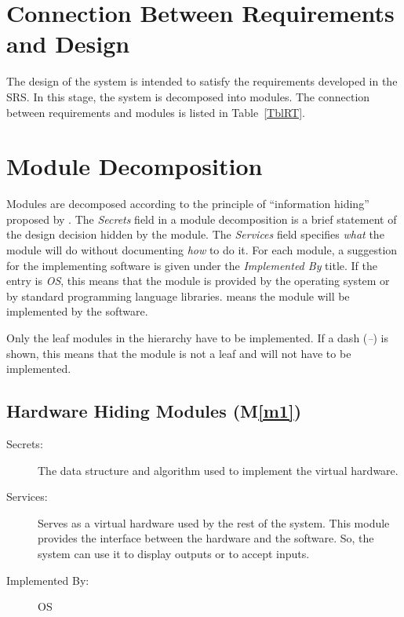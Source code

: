 \documentclass[12pt, titlepage]{article}
\newcommand{\mref}[1]{M\ref{#1}}
\begin{document}
\begin{table}[H]
\begin{longtable}{p{} p{}}
		\end{longtable}
		
		\label{TblMH}
	\end{table}
	\normalsize
	
	\section{Connection Between Requirements and Design} \label{SecConnection}
	
	The design of the system is intended to satisfy the requirements developed in
	the SRS. In this stage, the system is decomposed into modules. The connection
	between requirements and modules is listed in Table~\ref{TblRT}.
	
	\section{Module Decomposition} \label{SecMD}
	
	Modules are decomposed according to the principle of ``information hiding''
	proposed by \citet{ParnasEtAl1984}. The \emph{Secrets} field in a module
	decomposition is a brief statement of the design decision hidden by the
	module. The \emph{Services} field specifies \emph{what} the module will do
	without documenting \emph{how} to do it. For each module, a suggestion for the
	implementing software is given under the \emph{Implemented By} title. If the
	entry is \emph{OS}, this means that the module is provided by the operating
	system or by standard programming language libraries.  \emph{\progname{}} means the
	module will be implemented by the \progname{} software.
	
	Only the leaf modules in the hierarchy have to be implemented. If a dash
	(\emph{--}) is shown, this means that the module is not a leaf and will not have
	to be implemented.
	
	\subsection{Hardware Hiding Modules (\mref{m1})}
	
	\begin{description}
		\item[Secrets:]The data structure and algorithm used to implement the virtual hardware.
		\item[Services:]Serves as a virtual hardware used by the rest of the
		system. This module provides the interface between the hardware and the
		software. So, the system can use it to display outputs or to accept inputs.
		\item[Implemented By:] OS
	\end{description}
	
\end{document}
